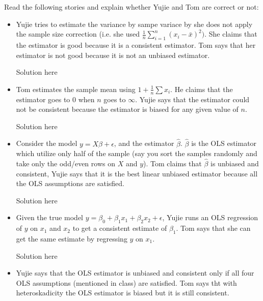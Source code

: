 \documentclass[11pt]{SelfArxOneColBMN}
\affiliation{\textsuperscript{1}\textit{John E. Walker Department of Economics,
Clemson University,Clemson, SC: email ijdavis@g.clemson.edu}}
\date{\small{Version ~\today}}
\begin{document}
\flushbottom

\maketitle

\begin{exercise}
	Read the following stories and explain whether Yujie and Tom are correct or not:
	\begin{itemize}
		\item Yujie tries to estimate the variance by sampe variace by she does not apply the sample size correction (i.e. she used $\frac{1}{n}\sum_{i=1}^{n}(x_i - \bar{x})^2)$. She claims that the estimator is good because it is a consistent estimator. Tom says that her estimator is not good because it is not an unbiased estimator.
		\begin{solution}
			Solution here
		\end{solution}
		\item Tom estimates the sample mean using $1 + \frac{1}{n}\sum x_i$. He claims that the estimator goes to 0 when $n$ goes to $\infty$. Yujie says that the estimator could not be consistent because the estimator is biased for any given value of $n$.
		\begin{solution}
			Solution here
		\end{solution}
		\item Consider the model $y = X\beta +  \epsilon$, and the estimator $\hat{\beta}$. $\hat{\beta}$ is the OLS estimator which utilize only half of the sample (say you sort the samples randomly and take only the odd/even rows on $X$ and $y$). Tom claims that $\hat{\beta}$ is unbiased and consistent, Yujie says that it is the best linear unbiased estimator because all the OLS assumptions are satisfied.
		\begin{solution}
			Solution here
		\end{solution}
		\item Given the true model $y = \beta_0 + \beta_1x_1 + \beta_2x_2 + \epsilon$, Yujie runs an OLS regression of $y$ on $x_1$ and $x_2$ to get a consistent estimate of $\beta_1$. Tom says that she can get the same estimate by regressing $y$ on $x_1$.
		\begin{solution}
			Solution here
		\end{solution}
		\item Yujie says that the OLS estimator is unbiased and consistent only if all four OLS assumptions (mentioned in class) are satisfied. Tom says tht with heteroskadicity the OLS estimator is biased but it is still consistent.
	\end{itemize}
\end{exercise}
\end{document}
